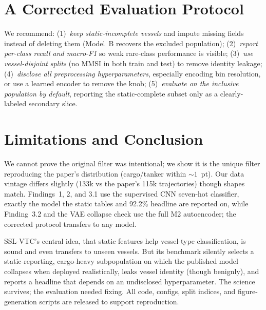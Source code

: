 \documentclass[conference,flushend]{iaria} %
\begin{document}
\section{A Corrected Evaluation Protocol}
We recommend: (1)~\emph{keep static-incomplete vessels} and impute missing fields
instead of deleting them (Model~B recovers the excluded population); (2)~\emph{report
per-class recall and macro-F1} so weak rare-class performance is visible; (3)~\emph{use
vessel-disjoint splits} (no MMSI in both train and test) to remove identity leakage;
(4)~\emph{disclose all preprocessing hyperparameters}, especially encoding bin
resolution, or use a learned encoder to remove the knob; (5)~\emph{evaluate on the
inclusive population by default}, reporting the static-complete subset only as a
clearly-labeled secondary slice.

\section{Limitations and Conclusion}
We cannot prove the original filter was intentional; we show it is the unique filter
reproducing the paper's distribution (cargo/tanker within ${\sim}1$~pt). Our data
vintage differs slightly (133k vs the paper's 115k trajectories) though shapes match.
Findings~1, 2, and 3.1 use the supervised CNN seven-hot classifier, exactly the
model the static tables and 92.2\% headline are reported on, while Finding~3.2 and
the VAE collapse check use the full M2 autoencoder; the corrected protocol transfers to
any model.

SSL-VTC's central idea, that static features help vessel-type classification, is
sound and even transfers to unseen vessels. But its benchmark silently selects a
static-reporting, cargo-heavy subpopulation on which the published model collapses
when deployed realistically, leaks vessel identity (though benignly), and reports a
headline that depends on an undisclosed hyperparameter. The science survives; the
evaluation needed fixing. All code, configs, split indices, and figure-generation
scripts are released to support reproduction.

\printbibliography
\end{document}
